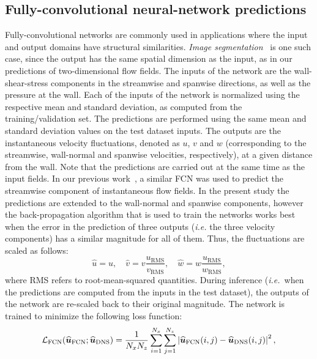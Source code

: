 \subsection{Fully-convolutional neural-network predictions}\label{ss:FCN}
Fully-convolutional networks are commonly used in applications where the input and output domains have structural similarities.
\textit{Image segmentation}~\citep{long2015fully} is one such case, since the output has the same spatial dimension as the input, as in our predictions of two-dimensional flow fields.
The inputs of the network are the wall-shear-stress components in the streamwise and spanwise directions, as well as the pressure at the wall.
Each of the inputs of the network is normalized using the respective mean and standard deviation, as computed from the training/validation set.
The predictions are performed using the same mean and standard deviation values on the test dataset inputs.
The outputs are the instantaneous velocity fluctuations, denoted as $u$, $v$ and $w$ (corresponding to the streamwise, wall-normal and spanwise velocities, respectively), at a given distance from the wall.
Note that the predictions are carried out at the same time as the input fields. In our previous work~\citep{guastoni2020prediction}, a similar FCN was used to predict the streamwise component of instantaneous flow fields.
In the present study the predictions are extended to the wall-normal and spanwise components, however the back-propagation algorithm that is used to train the networks works best when the error in the prediction of three outputs (\textit{i.e.} the three velocity components) has a similar magnitude for all of them.
Thus, the fluctuations are scaled as follows:
\begin{equation}
    \widehat{u} = u, \quad \widehat{v} = v \frac{u_\mathrm{RMS}}{v_\mathrm{RMS}}, \quad \widehat{w} = w \frac{u_\mathrm{RMS}}{w_\mathrm{RMS}},
    \label{scaling}
\end{equation}
\noindent where RMS refers to root-mean-squared quantities.
During inference (\textit{i.e.}\ when the predictions are computed from the inputs in the test dataset), the outputs of the network are re-scaled back to their original magnitude.
The network is trained to minimize the following loss function:
\begin{equation} \label{eq:loss}
\mathcal{L}_{{\rm FCN}}(\boldsymbol{\widehat{u}}_\mathrm{FCN};\boldsymbol{\widehat{u}}_\mathrm{DNS})=\frac{1}{N_x N_z} \sum_{i=1}^{N_x} \sum_{j=1}^{N_z} \left | \boldsymbol{\widehat{u}}_\mathrm{FCN}(i,j) - \boldsymbol{\widehat{u}}_\mathrm{DNS}(i,j)\right |^{2},
\end{equation}
